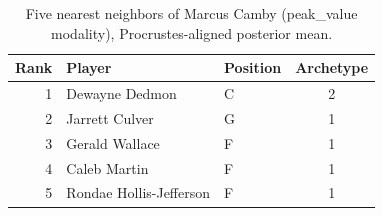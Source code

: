 \begin{table}[htbp]
  \centering\small
  \begin{tabular}{rllc}
    \toprule
    Rank & Player & Position & Archetype \\
    \midrule
    1 & Dewayne Dedmon & C & 2 \\
    2 & Jarrett Culver & G & 1 \\
    3 & Gerald Wallace & F & 1 \\
    4 & Caleb Martin & F & 1 \\
    5 & Rondae Hollis-Jefferson & F & 1 \\
    \bottomrule
  \end{tabular}
  \caption{Five nearest neighbors of Marcus Camby (peak_value modality), Procrustes-aligned posterior mean.}
  \label{tab:Marcus_Camby_neighbors_peak_value}
\end{table}

